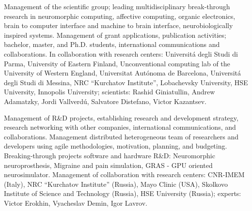 \documentclass{moderncv}
\begin{document}
    {Management of the scientific group; leading multidisciplinary break-through research in neuromorphic computing, affective computing, organic electronics, brain to computer interface and machine to brain interface, neurobiologically inspired systems. Management of grant applications, publication activities; bachelor, master, and Ph.D. students, international communications and collaborations. In collaboration with research centers: Universit\'{a} degli Studi di Parma, University of Eastern Finland, Unconventional computing lab of the University of Western England, Universitat Aut\'onoma de Barcelona, Universit\'{a} degli Studi di Messina, NRC “Kurchatov Institute”, Lobachevsky University, HSE University, Innopolis University; scientists: Rashid Giniatullin, Andrew Adamatzky, Jordi Vallverd\'{u}, Salvatore Distefano, Victor Kazantsev.}

    
    {Management of R\&D projects, establishing research and development strategy, research networking with other companies, international communications, and collaborations. Management distributed heterogeneous team of researchers and developers using agile methodologies, motivation, planning, and budgeting. Breaking-through projects software and hardware R\&D: Neuromorphic neuroprosthesis, Migraine and pain simulation, GRAS - GPU oriented neurosimulator. Management of collaboration with research centers: CNR-IMEM (Italy), NRC “Kurchatov Institute” (Russia), Mayo Clinic (USA), Skolkovo Institute of Science and Technology (Russia), HSE University (Russia); experts: Victor Erokhin, Vyacheslav Demin, Igor Lavrov. }


\end{document}
